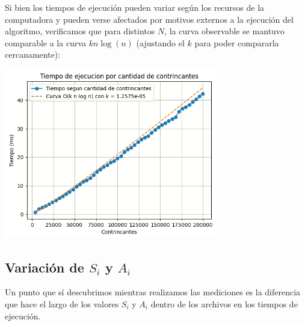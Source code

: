 \documentclass{estilo}
\begin{document}
Si bien los tiempos de ejecución pueden variar según los recursos de la computadora y pueden verse afectados por motivos externos a la ejecución del algoritmo, verificamos que para distintos $N$, la curva observable se mantuvo comparable a la curva $k n \log (n)$ (ajustando el $k$ para poder compararla cercanamente):
\begin{center}
\includegraphics[width=0.7\textwidth]{img/Results.png}
\end{center}
\subsection{Variación de $S_i$ y $A_i$}

Un punto que sí descubrimos mientras realizamos las mediciones es la diferencia que hace el largo de los valores $S_i$ y $A_i$ dentro de los archivos en los tiempos de ejecución.
\end{document}
